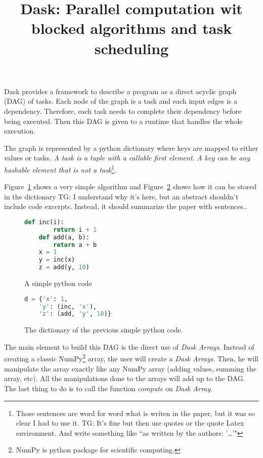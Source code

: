 \documentclass{article}
\title{Dask: Parallel computation wit blocked algorithms and task scheduling}
\newcommand{\tristan}[1]{\color{red}TG: #1}
\begin{document}
\maketitle

Dask provides a framework to describe a program as a direct acyclic graph (DAG) of tasks.
Each node of the graph is a task and each input edges is a dependency.
Therefore, each task needs to complete their dependency before being executed.
Then this DAG is given to a runtime that handles the whole execution.

The graph is represented by a python dictionary where keys are mapped to either values or tasks.
\textit{A task is a tuple with a callable first element}.
\textit{A key can be any hashable element that is not a task}\footnote{Those sentences are word for word what is writen in the paper, but it was so clear I had to use it. \tristan{It's fine but then use quotes or the quote Latex environment. And write something like
``as written by the authors: '\ldots'" }}.

Figure~\ref{fig:simple-python} shows a very simple algorithm and Figure~\ref{fig:simple-python-encode} shows how it can be stored in the dictionary \tristan{I understand why it's here, but an abstract shouldn't include code excerpts. 
Instead, it should summarize the paper with sentences.}.
\begin{figure}[H] 
	\begin{lstlisting}[language=python]
	def inc(i):
		return i + 1
	def add(a, b):
		return a + b
	x = 1
	y = inc(x)
	z = add(y, 10)
	\end{lstlisting}
	\caption{A simple python code}
	\label{fig:simple-python}
\end{figure} 
\begin{figure}[H] 
	\begin{lstlisting}[language=python]
	d = {'x': 1,
	'y': (inc, 'x'),
	'z': (add, 'y', 10)}
	\end{lstlisting}
	\caption{The dictionary of the previous simple python code.}
	\label{fig:simple-python-encode}
\end{figure} 

The main element to build this DAG is the direct use of \textit{Dask Arrays}.
Instead of creating a classic NumPy\footnote{NumPy is python package for scientific computing.} array, the user will create a \textit{Dask Arrays}.
Then, he will manipulate the array exactly like any NumPy array (adding values, summing the array, etc).
All the manipulations done to the arrays will add up to the DAG.
The last thing to do is to call the function \textit{compute} on \textit{Dask Array}.
\end{document}
